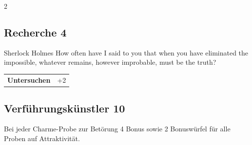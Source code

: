 \begin{multicols}{2}
\begin{tcolorbox}
\vspace{3mm}



\end{tcolorbox}

\begin{tcolorbox}
    \subsection*{Recherche \hfill \small{4 }}
    \tcblower


\begin{pquote}{Sherlock Holmes}
How often have I said to you that when you have eliminated the impossible, whatever remains, however improbable, must be the truth?
\end{pquote}

\vspace{3mm}

\begin{tabular}{@{}ll@{}}
    \textbf{Untersuchen} & +2\\
\end{tabular}


\end{tcolorbox}

\begin{tcolorbox}
    \subsection*{Verführungskünstler \hfill \small{10 }}
    \tcblower
Bei jeder Charme-Probe zur Betörung 4 Bonus sowie 2 Bonuswürfel für alle Proben auf Attraktivität.


\vspace{3mm}



\end{tcolorbox}


\end{multicols}
